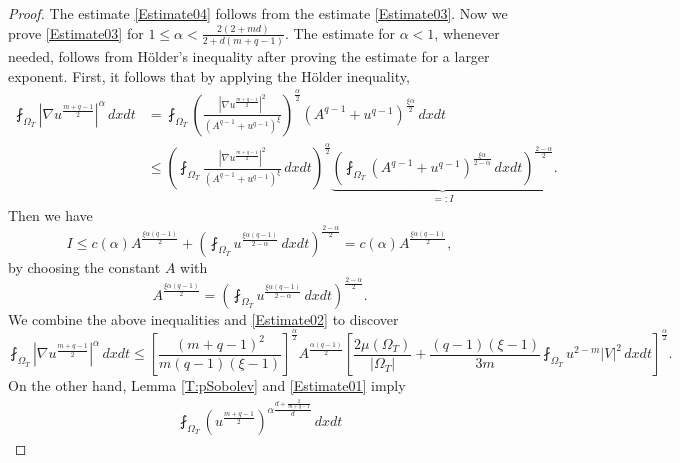 \documentclass{amsart}
\numberwithin{equation}{section}
\begin{document}
\begin{proof}
The estimate \eqref{Estimate04} follows from the estimate \eqref{Estimate03}. Now we prove \eqref{Estimate03} for
$1\le \alpha < \frac{2(2+md)}{2+d(m+q-1)}$.
The estimate for $\alpha<1$, whenever needed, follows from
H\"{o}lder's inequality after proving the estimate for a larger exponent. First, it follows that by applying the H\"{o}lder inequality,
\begin{equation*}
\begin{aligned}
  \fint_{\Omega_T} \left|\nabla u^{\frac{m+q-1}{2}}\right|^{\alpha} \,dxdt &= \fint_{\Omega_T} \left( \frac{\left|\nabla u^{\frac{m+q-1}{2}}\right|^2}{\left(A^{q-1}+u^{q-1}\right)^\xi} \right)^{\frac{\alpha}{2}} \left(A^{q-1}+u^{q-1}\right)^{\frac{\xi\alpha}{2}} \,dxdt\\
  &\le \left( \fint_{\Omega_T} \frac{\left|\nabla u^{\frac{m+q-1}{2}}\right|^2}{\left(A^{q-1}+u^{q-1}\right)^\xi} \,dxdt \right)^{\frac{\alpha}{2}} \underbrace{\left( \fint_{\Omega_T} \left(A^{q-1}+u^{q-1}\right)^{\frac{\xi\alpha}{2-\alpha}} \,dxdt \right)^{\frac{2-\alpha}{2}}}_{=:I}.
\end{aligned}
\end{equation*}
Then we have
\begin{equation*}
  I \le c(\alpha) A^{\frac{\xi\alpha(q-1)}{2}} + \left( \fint_{\Omega_T} u^{\frac{\xi\alpha(q-1)}{2-\alpha}} \,dxdt \right)^{\frac{2-\alpha}{2}} = c(\alpha) A^{\frac{\xi\alpha(q-1)}{2}},
\end{equation*}
by choosing the constant $A$ with
\begin{equation}\label{est03-01}
  A^{\frac{\xi\alpha(q-1)}{2}} = \left( \fint_{\Omega_T} u^{\frac{\xi\alpha(q-1)}{2-\alpha}} \,dxdt \right)^{\frac{2-\alpha}{2}}.
\end{equation}
We combine the above inequalities and \eqref{Estimate02} to discover
\begin{equation*}\label{est03-02}
\fint_{\Omega_T} \left|\nabla u^{\frac{m+q-1}{2}}\right|^{\alpha} \,dxdt
\le \left[\frac{(m+q-1)^2}{m(q-1)(\xi-1)}\right]^{\frac{\alpha}{2}} A^{\frac{\alpha(q-1)}{2}} \left[ \frac{2\mu(\Omega_{T})}{|\Omega_T|} + \frac{(q-1)(\xi-1)}{3m}\fint_{\Omega_T} u^{2-m} |V|^2 \,dxdt\right]^{\frac{\alpha}{2}}.
\end{equation*}
On the other hand, Lemma \ref{T:pSobolev} and \eqref{Estimate01} imply
\begin{equation}\label{est03-03}
\begin{aligned}
  \fint_{\Omega_T} \left(u^{\frac{m+q-1}{2}}\right)^{\alpha\frac{d+\frac{2}{m+q-1}}{d}} \,dxdt

\end{aligned}
\end{equation}
\end{proof}
\end{document}
